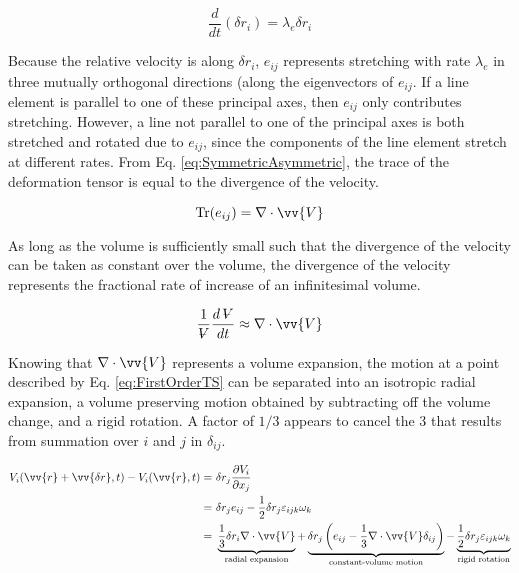 \documentclass[10pt]{article}
\newcommand{\volume}{\mathop{\ooalign{\hfil$V$\hfil\cr\kern0.08em--\hfil\cr}}\nolimits}
\numberwithin{equation}{section} %
\begin{document}
\begin{equation}
\label{eq:Eigenvalue3}
\frac{d}{dt}(\delta r_i)=\lambda_e \delta r_i
\end{equation}

Because the relative velocity is along \(\delta r_i\), \(e_{ij}\) represents stretching with rate \(\lambda_e\) in three mutually orthogonal directions (along the eigenvectors of \(e_{ij}\). If a line element is parallel to one of these principal axes, then \(e_{ij}\) only contributes stretching. However, a line not parallel to one of the principal axes is both stretched and rotated due to \(e_{ij}\), since the components of the line element stretch at different rates. From Eq. \eqref{eq:SymmetricAsymmetric}, the trace of the deformation tensor is equal to the divergence of the velocity.

\begin{equation}
\textrm{Tr}(e_{ij})=\nabla\cdot\vv{V}
\end{equation}

As long as the volume is sufficiently small such that the divergence of the velocity can be taken as constant over the volume, the divergence of the velocity represents the fractional rate of increase of an infinitesimal volume.

\begin{equation}
\label{eq:SignificanceofDivergence}
\frac{1}{\volume}\frac{d\volume}{dt}\approx\nabla\cdot\vv{V}
\end{equation}

Knowing that \(\nabla\cdot\vv{V}\) represents a volume expansion, the motion at a point described by Eq. \eqref{eq:FirstOrderTS} can be separated into an isotropic radial expansion, a volume preserving motion obtained by subtracting off the volume change, and a rigid rotation. A factor of \(1/3\) appears to cancel the 3 that results from summation over \(i\) and \(j\) in \(\delta_{ij}\).

\begin{equation}
\label{eq:MotionAtaPoint}
\begin{aligned}
V_i(\vv{r}+\vv{\delta r}, t)-V_i(\vv{r},t)=&\ \delta r_j\frac{\partial V_i}{\partial x_j}\hspace{6.38cm}\\
=&\ \delta r_je_{ij}-\frac{1}{2}\delta r_j\varepsilon_{ijk}\omega_k\hspace{4.47cm}\\
=&\ \underbrace{\frac{1}{3}\delta r_i\nabla\cdot\vv{V}}_\text{radial expansion}+\underbrace{\delta r_j\left(e_{ij}-\frac{1}{3}\nabla\cdot\vv{V}\delta_{ij}\right)}_\text{constant-volume motion}-\underbrace{\frac{1}{2}\delta r_j\varepsilon_{ijk}\omega_k}_\text{rigid rotation}\\
\end{aligned}
\end{equation}
\end{document}
